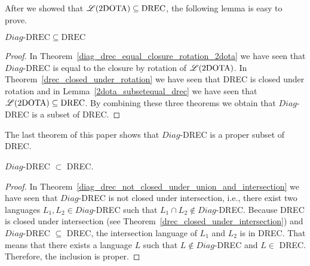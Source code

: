 After we showed that $\mathscr{L}(\text{2DOTA})\subseteq\text{DREC}$, the following lemma is easy to
prove.\newpage
\begin{lemma}
$Diag\text{-DREC}\subseteq\text{DREC}$
\label{diag_drec_subsetequal_drec}
\end{lemma}
\begin{proof}
In Theorem~\ref{diag_drec_equal_closure_rotation_2dota} we have seen that $Diag$-DREC is equal to
the closure by rotation of $\mathscr{L}(\text{2DOTA})$. In Theorem~\ref{drec_closed_under_rotation} we have
seen that DREC is closed under rotation and in Lemma~\ref{2dota_subsetequal_drec} we have seen
that $\mathscr{L}(\text{2DOTA})\subseteq\text{DREC}$. By combining these three theorems we obtain that
$Diag$-DREC is a subset of DREC.
\end{proof}
The last theorem of this paper shows that $Diag$-DREC is a proper subset of DREC.
\begin{theorem}
$Diag$-DREC $\subset$ DREC.
\end{theorem}
\begin{proof}
In Theorem~\ref{diag_drec_not_closed_under_union_and_intersection} we have seen that $Diag$-DREC is
not closed under intersection, i.e., there exist two languages $L_1, L_2 \in Diag$-DREC such that
$L_1 \cap L_2 \not\in Diag$-DREC. Because DREC is closed under intersection (see
Theorem~\ref{drec_closed_under_intersection}) and $Diag$-DREC $\subseteq$ DREC, the intersection
language of $L_1$ and $L_2$ is in DREC. That means that there exists a language $L$ such that
$L\not\in Diag$-DREC and $L \in$ DREC. Therefore, the inclusion is proper.
\end{proof}